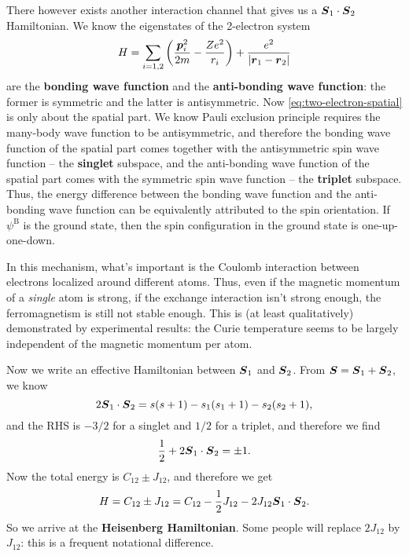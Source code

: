 \documentclass[hyperref, a4paper]{article}
\newcommand*{\concept}[1]{{\textbf{#1}}}
\begin{document}
There however exists another interaction channel 
that gives us a $\vb*{S}_1 \cdot \vb*{S}_2$ Hamiltonian.
We know the eigenstates of the 2-electron system 
\begin{equation}
    H = \sum_{i = 1,2 } \left(
        \frac{\vb*{p}_i^2}{2m} - \frac{Z e^2}{r_i}
    \right)
    + \frac{e^2}{\abs{\vb*{r}_1 - \vb*{r}_2}}   
    \label{eq:two-electron-spatial}
\end{equation}
are the \concept{bonding wave function} and the \concept{anti-bonding wave function}:
the former is symmetric and the latter is antisymmetric.
Now \eqref{eq:two-electron-spatial} is only about the spatial part.
We know Pauli exclusion principle requires the many-body wave function 
to be antisymmetric,
and therefore the bonding wave function of the spatial part 
comes together with the antisymmetric spin wave function -- the \concept{singlet} subspace,
and the anti-bonding wave function of the spatial part 
comes with the symmetric spin wave function -- the \concept{triplet} subspace.
Thus, the energy difference between the bonding wave function and the anti-bonding wave function 
can be equivalently attributed to the spin orientation.
If $\psi^\text{B}$ is the ground state, 
then the spin configuration in the ground state is one-up-one-down.

In this mechanism, 
what's important is the Coulomb interaction between electrons localized around different atoms.
Thus, even if the magnetic momentum of a \emph{single} atom is strong,
if the exchange interaction isn't strong enough,
the ferromagnetism is still not stable enough.
This is (at least qualitatively) demonstrated by experimental results:
the Curie temperature seems to be largely 
independent of the magnetic momentum per atom.

Now we write an effective Hamiltonian between $\vb*{S}_1$ and $\vb*{S}_2$.
From $\vb*{S} = \vb*{S}_1 + \vb*{S}_2$, we know 
\begin{equation}
    2 \vb*{S}_1 \cdot \vb*{S}_2 = 
    s(s+1) - s_1 (s_1 + 1) - s_2 (s_2 + 1),
\end{equation}
and the RHS is $-3/2$ for a singlet and $1/2$ for a triplet,
and therefore we find 
\[
    \frac{1}{2} + 2 \vb*{S}_1 \cdot \vb*{S}_2 = \pm 1.
\]
Now the total energy is $C_{12} \pm J_{12}$,
and therefore we get 
\begin{equation}
    H = C_{12} \pm J_{12} 
    = C_{12} - \frac{1}{2} J_{12} - 2 J_{12} \vb*{S}_1 \cdot \vb*{S}_2.
\end{equation}
So we arrive at the \concept{Heisenberg Hamiltonian}.
Some people will replace $2 J_{12}$ by $J_{12}$:
this is a frequent notational difference.
\end{document}
